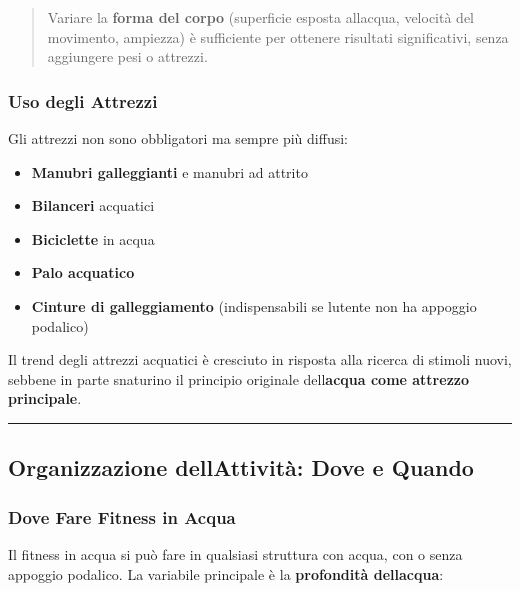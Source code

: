 \documentclass[a4paper,11pt]{article}
\providecommand{\tightlist}{%
  \setlength{\itemsep}{0pt}\setlength{\parskip}{0pt}}
\begin{document}
\begin{quote}
      Variare la \textbf{forma del corpo} (superficie esposta
      all\textquotesingle acqua, velocità del movimento, ampiezza) è
      sufficiente per ottenere risultati significativi, senza aggiungere pesi
      o attrezzi.
\end{quote}

\subsubsection{Uso degli Attrezzi}\label{uso-degli-attrezzi}

Gli attrezzi non sono obbligatori ma sempre più diffusi:

\begin{itemize}
      \tightlist
      \item
            \textbf{Manubri galleggianti} e manubri ad attrito
      \item
            \textbf{Bilanceri} acquatici
      \item
            \textbf{Biciclette} in acqua
      \item
            \textbf{Palo acquatico}
      \item
            \textbf{Cinture di galleggiamento} (indispensabili se
            l\textquotesingle utente non ha appoggio podalico)
\end{itemize}

Il trend degli attrezzi acquatici è cresciuto in risposta alla ricerca
di stimoli nuovi, sebbene in parte snaturino il principio originale
dell\textquotesingle{}\textbf{acqua come attrezzo principale}.

\begin{center}\rule{0.5\linewidth}{0.5pt}\end{center}

\subsection{Organizzazione dell\textquotesingle Attività: Dove e
      Quando}\label{organizzazione-dellattivituxe0-dove-e-quando}

\subsubsection{Dove Fare Fitness in
      Acqua}\label{dove-fare-fitness-in-acqua}

Il fitness in acqua si può fare in qualsiasi struttura con acqua, con o
senza appoggio podalico. La variabile principale è la \textbf{profondità
      dell\textquotesingle acqua}:
\end{document}
